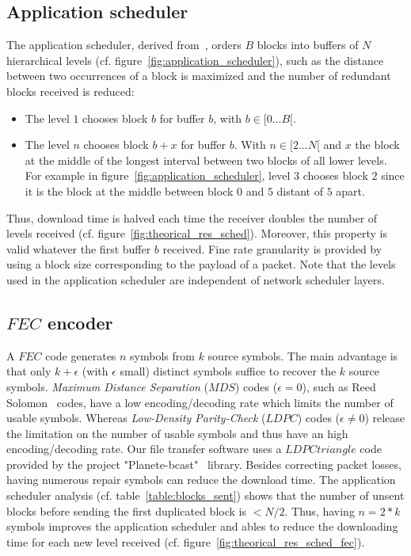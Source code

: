 \documentclass[a4paper]{article}
\begin{document}
    \subsection{Application scheduler}
        The application scheduler, derived from~\cite{birk_multicast_2003},
        orders $B$ blocks into buffers of $N$ hierarchical levels (cf.
                figure~\ref{fig:application_scheduler}), such as the distance
        between two occurrences of a block is maximized and the number of
        redundant blocks received is reduced:
\begin{itemize}
           \item{
               The level $1$ chooses block $b$ for buffer $b$, with $b
                   \in [0...B[$.
           } 
           \item{
               The level $n$ chooses block $b+x$ for buffer $b$. With $n \in
                   [2...N[$ and $x$ the block at the middle of the longest
                   interval between two blocks of all lower levels.  For example
                   in figure~\ref{fig:application_scheduler}, level $3$ chooses
                   block $2$ since it is the block at the middle between block
                   $0$ and $5$ distant of $5$ apart.
} 
        \end{itemize}
        Thus, download time is halved each time the receiver doubles the
        number of levels received (cf.  figure~\ref{fig:theorical_res_sched}).
        Moreover, this property is valid whatever the first buffer $b$ received.
Fine rate granularity is provided by using a block size corresponding to
        the payload of a packet.
Note that the levels used in the application scheduler are independent
        of network scheduler layers.

    \subsection{$FEC$ encoder}
        A $FEC$ code generates $n$ symbols from $k$ source symbols.  The main
        advantage is that only $k + \epsilon$ (with $\epsilon$ small) distinct
        symbols suffice to recover the $k$ source symbols.
\textit{Maximum Distance Separation} ($MDS$) codes ($\epsilon = 0$),
        such as Reed Solomon~\cite{rizzo_effective_1997} codes, have a low
        encoding/decoding rate which limits the
        number of usable symbols.
Whereas \textit{Low-Density Parity-Check} ($LDPC$) codes ($\epsilon \ne
                0$) release the limitation on the number of usable symbols and
        thus have an high encoding/decoding rate. Our file transfer software
        uses a $LDPC triangle$ code~\cite{roca_design_2003} provided by the
        project "Planete-bcast"~\cite{_planete-bcast:_2006} library.
Besides correcting packet losses, having numerous repair symbols can
        reduce the download time.  The application scheduler analysis (cf.
                table~\ref{table:blocks_sent}) shows that the number of unsent
        blocks before sending the first duplicated block is $< N/2$.  Thus,
        having $n = 2 * k$ symbols improves the application scheduler and ables
        to reduce the downloading time for each new level received (cf.
                figure~\ref{fig:theorical_res_sched_fec}).
\end{document}
